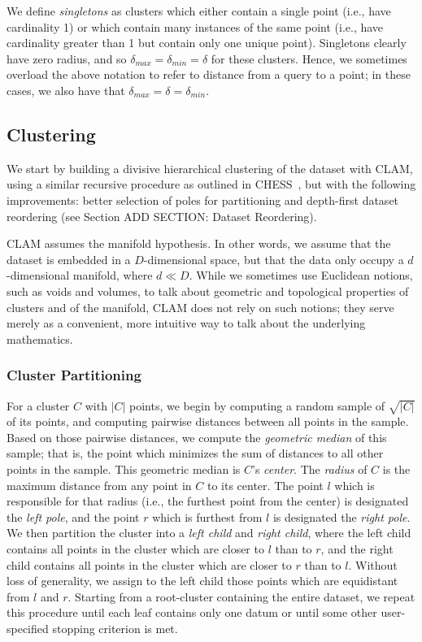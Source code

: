 We define \emph{singletons} as clusters which either contain a single point (i.e., have cardinality 1) or which contain 
many instances of the same point (i.e., have cardinality greater than 1 but contain only one unique point). Singletons clearly 
have zero radius, and so $\delta_{max} = \delta_{min} = \delta$ for these clusters. Hence, we sometimes overload the above 
notation to refer to distance from a query to a point; in these cases, we also have that $\delta_{max} = \delta = \delta_{min}$.


\subsection{Clustering}
\label{subsec:methods:clustering}

We start by building a divisive hierarchical clustering of the dataset with CLAM, using a 
similar recursive procedure as outlined in CHESS~\cite{ishaq2019clustered}, but with the following 
improvements: better selection of poles for partitioning and depth-first dataset reordering 
(see Section ADD SECTION: Dataset Reordering). 


CLAM assumes the manifold hypothesis. 
In other words, we assume that the dataset is embedded in a $D$-dimensional space, but that the data only occupy 
a $d$-dimensional manifold, where $d \ll D$. 
While we sometimes use Euclidean notions, such as voids and volumes, to talk about geometric and topological 
properties of clusters and of the manifold, CLAM does not rely on such notions; 
they serve merely as a convenient, more intuitive way to talk about the underlying mathematics.

\subsubsection {Cluster Partitioning}

For a cluster $C$ with $|C|$ points, we begin by computing a 
random sample of $\sqrt{|C|}$ of its points, and computing pairwise distances 
between all points in the sample. Based on those pairwise distances, we compute the \emph{geometric median} of this sample; 
that is, the point which minimizes the sum of distances to all other points in the sample. This geometric median 
is $C$'s \emph{center}. The \emph{radius} of $C$ is the maximum distance from any point in $C$ to its center.
The point $l$ which is responsible for that radius (i.e., the furthest point from the center) is designated the \emph{left pole}, and the point $r$ which is furthest
from $l$ is designated the \emph{right pole}. We then partition the cluster into a \emph{left child} and \emph{right child}, where the 
left child contains all points in the cluster which are closer to $l$ than to $r$, and the right child contains all 
points in the cluster which are closer to $r$ than to $l$. Without loss of generality, we assign to the left child 
those points which are equidistant from $l$ and $r$. Starting from a root-cluster containing the entire dataset, we 
repeat this procedure until each leaf contains only one datum or until some other user-specified stopping criterion 
is met.


